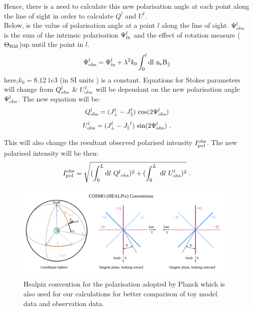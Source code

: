 \documentclass[12pt, a4 paper]{article}
\begin{document}
Hence, there is a need to calculate this new polarisation angle at each point along the line of sight in order to calculate $Q^l$ and $U^l$.\\ Below, is the value of polarisation angle at a point $l$ along the line of sight. $\Psi^l_{\rm obs}$ is the sum of the intrinsic polarisation $\Psi^l_{\rm in}$ and the effect of rotation measure ($\Theta_{\rm RM}$)up until the point in $l$.
\begin{eqnarray}
\Psi^l_{\rm obs} = \Psi^l_{\rm in} + \lambda^2  k_0\int_{0}^{l}  \rm{d}l \ n_e B_{\parallel}
\end{eqnarray}
here,$k_0 = 8.12 \ 1e3$ (in SI units \cite{Longair}) is a constant.
Equations for Stokes parameters will change from $Q^l_{\rm obs}$ \& $U^l_{\rm obs}$ will be dependant on the new polarisation angle $\Psi^l_{\rm obs}$. The new equation will be:
\begin{eqnarray}
Q^l_{\rm obs} = ({J_{\perp}^l} - {J_{\parallel}^l}) \ {\cos}(2\Psi^l_{\rm obs})
\end{eqnarray}
\begin{eqnarray}
U^l_{\rm obs} = ({J_{\perp}^l}- {J_{\parallel}}^l) \ {\sin}(2\Psi^l_{\rm obs}) \ .
\end{eqnarray}

This will also change the resultant observed polarised intensity $I_{\rm pol}^{\rm obs}$.
The new polarised intensity will be then:
\begin{eqnarray}
I_{\rm pol}^{\rm obs} = \sqrt{(\int_0^L \mathrm{d}l \ {Q^l}_{\rm obs})^2+(\int_0^L \ \mathrm{d}l \ {U^l_{\rm obs})^2}} \ .
\end{eqnarray}
\begin{figure}[h!]
    \centering
    \includegraphics[width = 15cm]{Images/Healpix_Conventions.png}
    \caption{Healpix convention for the polarisation adopted by Planck which is also used for our calculations for better comparison of toy model data and observation data.}
    \label{fig:Planck_ang_con}
\end{figure}
\fi
\end{document}
